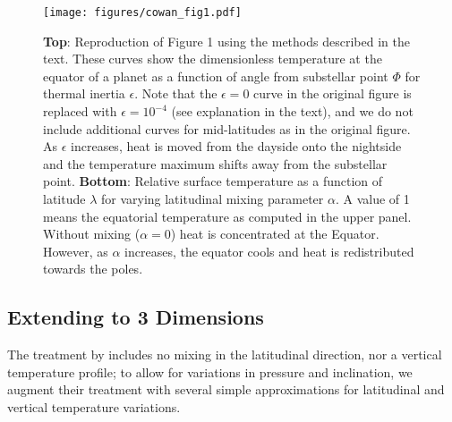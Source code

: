 \documentclass[twocolumn]{aastex631}
\begin{document}
\begin{figure}
    \centering
    \texttt{[image: figures/cowan\_fig1.pdf]}
    \caption{
        {\bf Top}: Reproduction of \citet{cowan2011} Figure 1 using the methods described in the text. These curves show the dimensionless temperature at the equator of a planet as a function of angle from substellar point $\Phi$ for thermal inertia $\epsilon$. Note that the $\epsilon=0$ curve in the original figure is replaced with $\epsilon=10^{-4}$ (see explanation in the text), and we do not include additional curves for mid-latitudes as in the original figure. As $\epsilon$ increases, heat is moved from the dayside onto the nightside and the temperature maximum shifts away from the substellar point.
        {\bf Bottom}: Relative surface temperature as a function of latitude $\lambda$ for varying latitudinal mixing parameter $\alpha$. A value of 1 means the equatorial temperature as computed in the upper panel. Without mixing ($\alpha=0$) heat is concentrated at the Equator. However, as $\alpha$ increases, the equator cools and heat is redistributed towards the poles.
    }
    \label{fig:cowan_curves}
\end{figure}

\subsection{Extending to 3 Dimensions}

The treatment by \citet{cowan2011} includes no mixing in the latitudinal direction, nor a vertical temperature profile; to allow for variations in pressure and inclination, we augment their treatment with several simple approximations for latitudinal and vertical temperature variations. 
\end{document}
